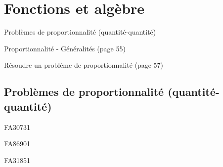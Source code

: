 \documentclass[a4paper,11pt]{report}
\begin{document}
\newcommand{\chapterName}{Fonctions et algèbre}
\newcommand{\serieName}{Problèmes de proportionnalité (quantité-quantité)}

\chapter*{\chapterName}
\thispagestyle{empty}

\begin{amL}{\serieName}{
\item Proportionnalité - Généralités (page 55)
\item Résoudre un problème de proportionnalité (page 57)
}\end{amL}

\section*{\serieName}
\setcounter{page}{1}












\begin{QSJ}{83}{1}
\end{QSJ}


\begin{exol}{FA30}{73}{1} %
\end{exol}

\begin{exol}{FA86}{90}{1} %
\end{exol}

\begin{exof}{FA31}{85}{1} %
\end{exof}
\end{document}
